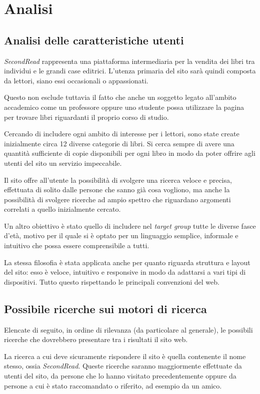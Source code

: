 \section{Analisi}

\subsection{Analisi delle caratteristiche utenti}
\textit{SecondRead} rappresenta una piattaforma intermediaria per la vendita dei libri tra individui e le grandi case editrici. L’utenza primaria del sito sarà quindi composta da lettori, siano essi occasionali o appassionati.

Questo non esclude tuttavia il fatto che anche un soggetto legato all’ambito accademico come un professore oppure uno studente possa utilizzare la pagina per trovare libri riguardanti il proprio corso di studio.

Cercando di includere ogni ambito di interesse per i lettori, sono state create inizialmente circa 12 diverse categorie di libri. Si cerca sempre di avere una quantità sufficiente di copie disponibili per ogni libro in modo da poter offrire agli utenti del sito un servizio impeccabile.

Il sito offre all’utente la possibilità di svolgere una ricerca veloce e precisa, effettuata di solito dalle persone che sanno già cosa vogliono, ma anche la possibilità di svolgere ricerche ad ampio spettro che riguardano argomenti correlati a quello inizialmente cercato.

Un altro obiettivo è stato quello di includere nel \textit{target group} tutte le diverse fasce d’età, motivo per il quale si è optato per un linguaggio semplice, informale e intuitivo che possa essere comprensibile a tutti.

La stessa filosofia è stata applicata anche per quanto riguarda struttura e layout del sito: esso è veloce, intuitivo e responsive in modo da adattarsi a vari tipi di dispositivi. Tutto questo rispettando le principali convenzioni del web.

\subsection{Possibile ricerche sui motori di ricerca}
Elencate di seguito, in ordine di rilevanza (da particolare al generale), le possibili ricerche che dovrebbero presentare tra i risultati il sito web.

La ricerca a cui deve sicuramente rispondere il sito è quella contenente il nome stesso, ossia \textit{SecondRead}. Queste ricerche saranno maggiormente effettuate da utenti del sito, da persone che lo hanno visitato precedentemente oppure da persone a cui è stato raccomandato o riferito, ad esempio da un amico.

